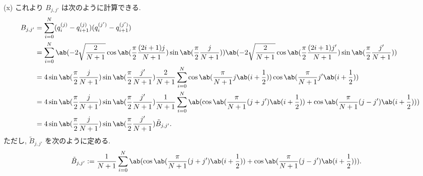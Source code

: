 \documentclass[uplatex,dvipdfmx,a4paper,11pt]{jlreq}
\numberwithin{equation}{section}
\theoremstyle{definition}
\begin{document}
(x) これより $B_{j,j'}$ は次のように計算できる.
\begin{align}
  B_{j,j'} & = \sum_{i=0}^{N}(q_i^{(j)} - q_{i+1}^{(j)})(q_i^{(j')} - q_{i+1}^{(j')})                                                                                                                                                         \\
           & = \sum_{i=0}^{N}\ab(-2\sqrt{\frac{2}{N+1}}\cos\ab(\frac{\pi}{2}\frac{(2i+1)j}{N+1})\sin\ab(\frac{\pi}{2}\frac{j}{N+1}))\ab(-2\sqrt{\frac{2}{N+1}}\cos\ab(\frac{\pi}{2}\frac{(2i+1)j'}{N+1})\sin\ab(\frac{\pi}{2}\frac{j'}{N+1})) \\
           & = 4\sin\ab(\frac{\pi}{2}\frac{j}{N+1})\sin\ab(\frac{\pi}{2}\frac{j'}{N+1})\frac{2}{N+1}\sum_{i=0}^{N}\cos\ab(\frac{\pi}{N+1}j\ab(i + \frac{1}{2}))\cos\ab(\frac{\pi}{N+1}j'\ab(i + \frac{1}{2}))                                 \\
           & = 4\sin\ab(\frac{\pi}{2}\frac{j}{N+1})\sin\ab(\frac{\pi}{2}\frac{j'}{N+1})\frac{1}{N+1}\sum_{i=0}^{N}\ab(\cos\ab(\frac{\pi}{N+1}(j + j')\ab(i + \frac{1}{2})) + \cos\ab(\frac{\pi}{N+1}(j - j')\ab(i + \frac{1}{2})))            \\
           & = 4\sin\ab(\frac{\pi}{2}\frac{j}{N+1})\sin\ab(\frac{\pi}{2}\frac{j'}{N+1})\tilde{B}_{j,j'}.
\end{align}
ただし, $\tilde{B}_{j,j'}$ を次のように定める.
\begin{align}
  \tilde{B}_{j,j'} & := \frac{1}{N+1}\sum_{i=0}^{N}\ab(\cos\ab(\frac{\pi}{N+1}(j + j')\ab(i + \frac{1}{2})) + \cos\ab(\frac{\pi}{N+1}(j - j')\ab(i + \frac{1}{2}))).
\end{align}
\end{document}
